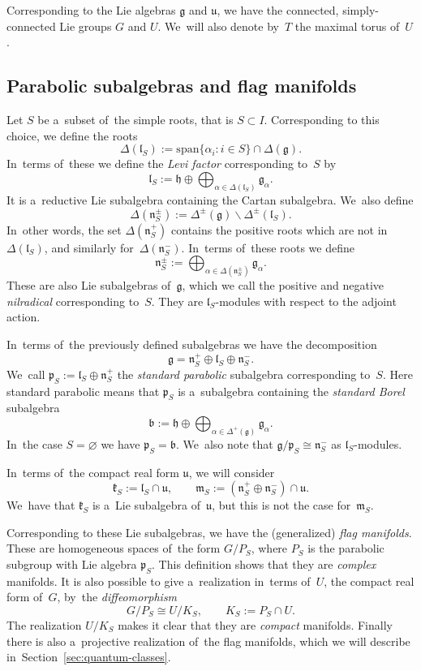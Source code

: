 \documentclass[pdftex]{sigma}
\numberwithin{equation}{section}
\newcommand{\lieb}{\mathfrak{b}}
\newcommand{\lieg}{\mathfrak{g}}
\newcommand{\lieh}{\mathfrak{h}}
\newcommand{\liek}{\mathfrak{k}}
\newcommand{\liel}{\mathfrak{l}}
\newcommand{\liem}{\mathfrak{m}}
\newcommand{\lien}{\mathfrak{n}}
\newcommand{\liep}{\mathfrak{p}}
\newcommand{\lieu}{\mathfrak{u}}
\begin{document}
Corresponding to the Lie algebras $\lieg$ and $\lieu$, we have the connected, simply-connected Lie groups $G$ and $U$.
We~will also denote by~$T$ the maximal torus of~$U$.

\subsection{Parabolic subalgebras and flag manifolds}

Let $S$ be a~subset of~the simple roots, that is $S \subset I$.
Corresponding to this choice, we define the roots
\[
\Delta(\liel_S) := \mathrm{span} \{ \alpha_i\colon i \in S \} \cap \Delta(\lieg).
\]
In~terms of~these we define the \emph{Levi factor} corresponding to~$S$ by
\[
\liel_S := \lieh \oplus \bigoplus_{\alpha \in \Delta(\liel_S)} \lieg_\alpha.
\]
It is a~reductive Lie subalgebra containing the Cartan subalgebra.
We~also define
\[
\Delta(\lien_S^\pm) := \Delta^\pm(\lieg) \backslash \Delta^\pm(\liel_S).
\]
In~other words, the set $\Delta(\lien_S^+)$ contains the positive roots which are not in~$\Delta(\liel_S)$, and similarly for~$\Delta(\lien_S^-)$.
In~terms of~these roots we define
\[
\lien_S^\pm := \bigoplus_{\alpha \in \Delta(\lien_S^\pm)} \lieg_\alpha.
\]
These are also Lie subalgebras of~$\lieg$, which we call the positive and negative \emph{nilradical} corresponding to~$S$.
They are $\liel_S$-modules with respect to the adjoint action.

In~terms of~the previously defined subalgebras we have the decomposition
\[
\lieg = \lien_S^+ \oplus \liel_S \oplus \lien_S^-.
\]
We~call $\liep_S := \liel_S \oplus \lien_S^+$ the \emph{standard parabolic} subalgebra corresponding to~$S$.
Here standard parabolic means that $\liep_S$ is a~subalgebra containing the \emph{standard Borel} subalgebra
\[
\lieb := \lieh \oplus \bigoplus_{\alpha \in \Delta^+(\lieg)} \lieg_\alpha.
\]
In~the case $S = \varnothing$ we have $\liep_S = \lieb$.
We~also note that $\lieg / \liep_S \cong \lien_S^-$ as $\liel_S$-modules.

In~terms of~the compact real form $\lieu$, we will consider
\[
\liek_S := \liel_S \cap \lieu, \qquad
\liem_S := (\lien_S^+ \oplus \lien_S^-) \cap \lieu.
\]
We~have that $\liek_S$ is a~Lie subalgebra of~$\lieu$, but this is not the case for~$\liem_S$.

Corresponding to these Lie subalgebras, we have the (generalized) \emph{flag manifolds}.
These are homogeneous spaces of~the form $G / P_S$, where $P_S$ is the parabolic subgroup with Lie algebra $\liep_S$.
This definition shows that they are \emph{complex} manifolds.
It is also possible to give a~realization in~terms of~$U$, the compact real form of~$G$, by~the \emph{diffeomorphism}
\[
G / P_S \cong U / K_S, \qquad K_S := P_S \cap U.
\]
The realization $U / K_S$ makes it clear that they are \emph{compact} manifolds.
Finally there is also a~projective realization of~the flag manifolds, which we will describe in~Section~\ref{sec:quantum-classes}.
\end{document}
